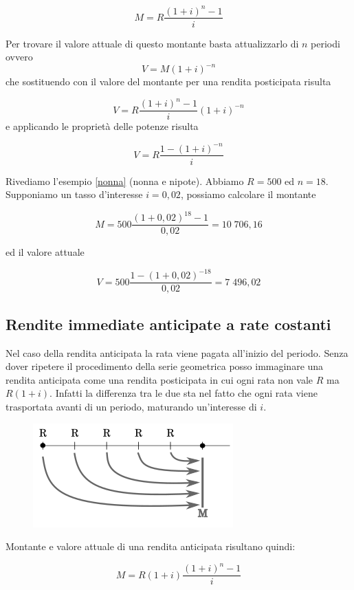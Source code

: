 \begin{definizione}
\[ M=R\dfrac{(1+i)^n-1}{i} \]
\end{definizione}

Per trovare il valore attuale di questo montante basta attualizzarlo di \(n\) 
periodi ovvero
\[V=M(1+i)^{-n}\]
che sostituendo con il valore del montante per una rendita posticipata 
risulta

 \[V=R\dfrac{(1+i)^n-1}{i}(1+i)^{-n}\]
e applicando le proprietà delle potenze risulta


\begin{definizione}
\[ V=R\dfrac{1-(1+i)^{-n}}{i} \]
\end{definizione}

\begin{exrig}
\begin{esempio}
Rivediamo l'esempio \ref{nonna} (nonna e nipote). Abbiamo \(R=500\) ed \(n=18\).
Supponiamo un tasso d'interesse \(i=0,02\), possiamo calcolare il montante

\[ M=500\dfrac{(1+0,02)^{18}-1}{0,02}=10\;706,16 \]

ed il valore attuale

\[ V=500\dfrac{1-(1+0,02)^{-18}}{0,02}=7\;496,02 \]
\end{esempio}
\end{exrig}

\subsection{Rendite immediate anticipate a rate costanti}
Nel caso della rendita anticipata la rata viene pagata all'inizio del 
periodo. Senza dover ripetere il procedimento della serie geometrica posso 
immaginare una rendita anticipata come una rendita posticipata in cui ogni 
rata non vale \(R\) ma \(R(1+i)\). Infatti la differenza tra le due sta nel 
fatto che ogni rata viene trasportata avanti di un periodo, maturando 
un'interesse di \(i\).
\begin{figure}[htp]
\centering
\includegraphics[scale=1]{img/anticipata.png}

\end{figure}
Montante e valore attuale di una rendita anticipata risultano quindi:
\begin{definizione}
\[ M=R(1+i)\dfrac{(1+i)^n-1}{i} \]
\end{definizione}


